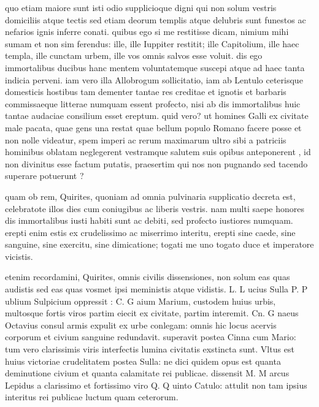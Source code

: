  quo etiam maiore sunt isti odio supplicioque digni qui non solum vestris domiciliis atque tectis sed etiam deorum templis atque delubris sunt funestos ac nefarios ignis inferre conati. quibus ego si me restitisse dicam, nimium mihi sumam et non sim ferendus: ille, ille Iuppiter restitit; ille Capitolium, ille haec templa, ille cunctam urbem, ille vos omnis salvos esse voluit. dis ego immortalibus ducibus hanc mentem voluntatemque suscepi atque ad haec tanta indicia perveni. iam vero illa Allobrogum sollicitatio, iam ab Lentulo ceterisque domesticis hostibus tam dementer tantae res creditae et ignotis et barbaris commissaeque litterae numquam essent profecto, nisi ab dis immortalibus huic tantae audaciae consilium esset ereptum. quid vero? ut homines Galli ex civitate male pacata, quae gens una restat quae bellum populo Romano facere posse et non nolle videatur, spem imperi ac rerum maximarum ultro sibi a patriciis hominibus oblatam neglegerent vestramque salutem suis opibus anteponerent , id non divinitus esse factum putatis, praesertim qui nos non pugnando sed tacendo superare potuerunt ?

 quam ob rem, Quirites, quoniam ad omnia pulvinaria supplicatio decreta est, celebratote illos dies cum coniugibus ac liberis vestris. nam multi saepe honores dis immortalibus iusti habiti sunt ac debiti, sed profecto iustiores numquam. erepti enim estis ex crudelissimo ac miserrimo interitu, erepti sine caede, sine sanguine, sine exercitu, sine dimicatione; togati me uno togato duce et imperatore vicistis.

 etenim recordamini, Quirites, omnis civilis dissensiones, non solum eas quas audistis sed eas quas vosmet ipsi meministis atque vidistis. L. L ucius Sulla P. P ublium Sulpicium oppressit : C. G aium Marium, custodem huius urbis, multosque fortis viros partim eiecit ex civitate, partim interemit. Cn. G naeus Octavius consul armis expulit ex urbe conlegam: omnis hic locus acervis corporum et civium sanguine redundavit. superavit postea Cinna cum Mario: tum vero clarissimis viris interfectis lumina civitatis exstincta sunt. Vltus est huius victoriae crudelitatem postea Sulla: ne dici quidem opus est quanta deminutione civium et quanta calamitate rei publicae. dissensit M. M arcus Lepidus a clarissimo et fortissimo viro Q. Q uinto Catulo: attulit non tam ipsius interitus rei publicae luctum quam ceterorum.

